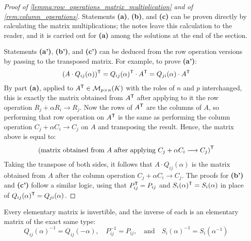 \begin{proof}[Proof of \cref{lemma:row_operations_matrix_multiplication} and of \cref{rem:column_operations}]
Statements \textbf{(a)}, \textbf{(b)}, and \textbf{(c)} can be proven directly by calculating the matrix multiplications; the notes leave this calculation to the reader, and it is carried out for \textbf{(a)} among the solutions at the end of the section.

Statements \textbf{(a')}, \textbf{(b')}, and \textbf{(c')} can be deduced from the row operation versions by passing to the transposed matrix. For example, to prove \textbf{(a')}:
\begin{equation*}
    (A \cdot Q_{ij}(\alpha))^{\mathsf{T}} = Q_{ij}(\alpha)^{\mathsf{T}} \cdot A^{\mathsf{T}} = Q_{ji}(\alpha) \cdot A^{\mathsf{T}}
\end{equation*}
By part \textbf{(a)}, applied to $A^{\mathsf{T}} \in \mathcal{M}_{p \times n}(K)$ with the roles of $n$ and $p$ interchanged, this is exactly the matrix obtained from $A^{\mathsf{T}}$ after applying to it the row operation $R_j + \alpha R_i \longrightarrow R_j$.
Now the rows of $A^{\mathsf{T}}$ are the columns of $A$, so performing that row operation on $A^{\mathsf{T}}$ is the same as performing the column operation $C_j + \alpha C_i \longrightarrow C_j$ on $A$ and transposing the result. Hence, the matrix above is equal to:
\begin{equation*}
    \left( \text{matrix obtained from } A \text{ after applying } C_j + \alpha C_i \longrightarrow C_j \right)^{\mathsf{T}}
\end{equation*}
Taking the transpose of both sides, it follows that $A \cdot Q_{ij}(\alpha)$ is the matrix obtained from $A$ after the column operation $C_j + \alpha C_i \longrightarrow C_j$. The proofs for \textbf{(b')} and \textbf{(c')} follow a similar logic, using that $P_{ij}^{\mathsf{T}} = P_{ij}$ and $S_i(\alpha)^{\mathsf{T}} = S_i(\alpha)$ in place of $Q_{ij}(\alpha)^{\mathsf{T}} = Q_{ji}(\alpha)$.
\end{proof}

\begin{lemma}
\label{lemma:elementary_matrix_inverses}
Every elementary matrix is invertible, and the inverse of each is an elementary matrix of the exact same type:
\begin{equation*}
    Q_{ij}(\alpha)^{-1} = Q_{ij}(-\alpha), \quad P_{ij}^{-1} = P_{ij}, \quad \text{and} \quad S_i(\alpha)^{-1} = S_i(\alpha^{-1})
\end{equation*}
\end{lemma}

